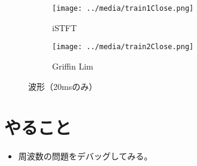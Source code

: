 \documentclass[a4paper, 12pt]{article}
\begin{document}
\begin{figure}
\centering
\begin{subfigure}{.5\textwidth}
  \centering
  \texttt{[image: ../media/train1Close.png]}
  \caption{iSTFT}
  \label{fig:zoom1}
\end{subfigure}%
\begin{subfigure}{.5\textwidth}
  \centering
  \texttt{[image: ../media/train2Close.png]}
  \caption{Griffin Lim}
  \label{fig:zoom2}
\end{subfigure}
\caption{波形（20msのみ）}
\label{fig:zoomComp}
\end{figure}


\section*{やること}
\begin{itemize}
    \item 周波数の問題をデバッグしてみる。
\end{itemize}




\end{document}
